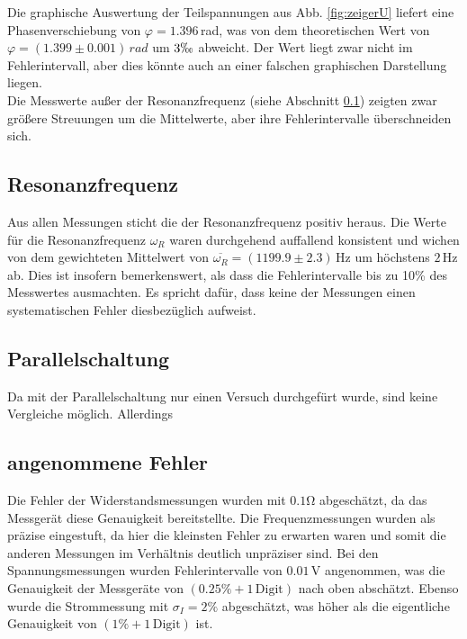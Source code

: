 \documentclass[12pt,a4paper,titlepage,headinclude,bibtotoc]{scrartcl}
\begin{document}
Die graphische Auswertung der Teilspannungen aus Abb. \ref{fig:zeigerU} liefert eine Phasenverschiebung von $\varphi=1.396\,$rad, was von dem theoretischen Wert von $\varphi=(1.399 \pm 0.001)\,\si{rad}$ um $3\permil$ abweicht.
Der Wert liegt zwar nicht im Fehlerintervall, aber dies könnte auch an einer falschen graphischen Darstellung liegen.\\

Die Messwerte außer der Resonanzfrequenz (siehe Abschnitt \ref{sec:resodisku}) zeigten zwar größere Streuungen um die Mittelwerte, aber ihre Fehlerintervalle überschneiden sich.



\subsection{Resonanzfrequenz}
\label{sec:resodisku}
Aus allen Messungen sticht die der Resonanzfrequenz positiv heraus.
Die Werte für die Resonanzfrequenz $\omega_R$ waren durchgehend auffallend konsistent und wichen von dem gewichteten Mittelwert von $\overline{\omega_R}=(1199.9\pm2.3)\,\si\hertz$ um höchstens $2\,\si\hertz$ ab.
Dies ist insofern bemerkenswert, als dass die Fehlerintervalle bis zu 10\% des Messwertes ausmachten.
Es spricht dafür, dass keine der Messungen einen systematischen Fehler diesbezüglich aufweist.

\subsection{Parallelschaltung}
Da mit der Parallelschaltung nur einen Versuch durchgefürt wurde, sind keine Vergleiche möglich.
Allerdings 

\subsection{angenommene Fehler}
Die Fehler der Widerstandsmessungen wurden mit $0.1\si\ohm$ abgeschätzt, da das Messgerät diese Genauigkeit bereitstellte.
Die Frequenzmessungen wurden als präzise eingestuft, da hier die kleinsten Fehler zu erwarten waren und somit die anderen Messungen im Verhältnis deutlich unpräziser sind.
Bei den Spannungsmessungen wurden Fehlerintervalle von $0.01\,\si\volt$ angenommen, was die Genauigkeit der Messgeräte von $(0.25\%+1\,\text{Digit})$ nach oben abschätzt.
Ebenso wurde die Strommessung mit $\sigma_I=2\%$ abgeschätzt, was höher als die eigentliche Genauigkeit von $(1\%+1\,\text{Digit})$ ist.




\end{document}
